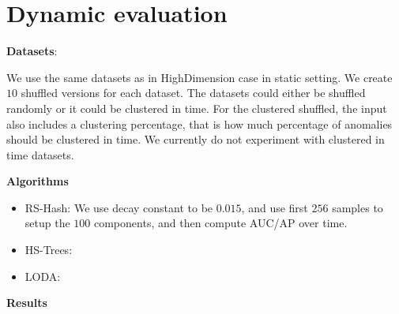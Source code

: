 
\section{Dynamic evaluation}

\textbf{Datasets}:

We use the same datasets as in HighDimension case in static setting. We create $10$ shuffled versions for each dataset. The datasets could either be shuffled randomly or it could be clustered in time. For the clustered shuffled, the input also includes a clustering percentage, that is how much percentage of anomalies should be clustered in time. We currently do not experiment with clustered in time datasets.

\textbf{Algorithms}
\begin{itemize}
\item{RS-Hash}: We use decay constant to be $0.015$, and use first $256$ samples to setup the $100$ components, and then compute AUC/AP over time.
\item{HS-Trees}:
\item{LODA}:
\end{itemize}

\textbf{Results}


